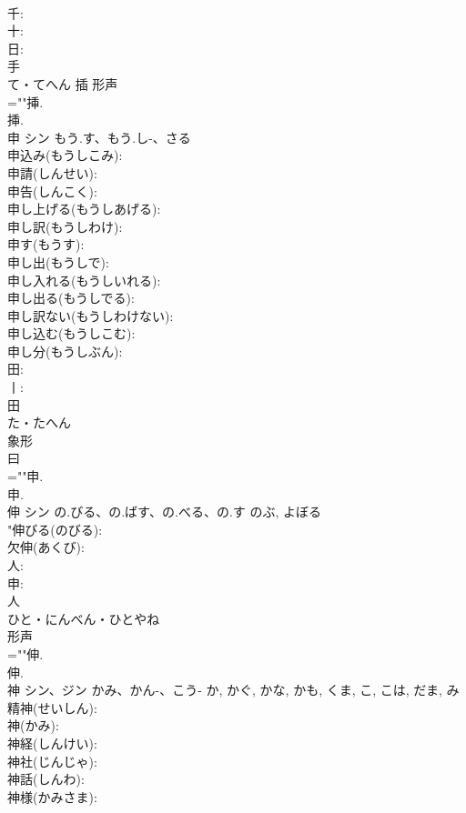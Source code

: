 \documentclass[8pt]{extreport}
\begin{document}
\begin{CJK}{UTF8}{min}
\\	千: 
\\	十: 
\\	日: 
\\	手	
\\	て・てへん	插	形声 
\\	=""挿.
\\	挿.
\\	申	シン	もう.す、もう.し-、さる		
\\	申込み(もうしこみ): 
\\	申請(しんせい): 
\\	申告(しんこく): 
\\	申し上げる(もうしあげる): 
\\	申し訳(もうしわけ): 
\\	申す(もうす): 
\\	申し出(もうしで): 
\\	申し入れる(もうしいれる): 
\\	申し出る(もうしでる): 
\\	申し訳ない(もうしわけない): 
\\	申し込む(もうしこむ): 
\\	申し分(もうしぶん): 
\\	田: 
\\	丨: 
\\	田	
\\	た・たへん	
\\	象形 
\\	曰 
\\	=""申.
\\	申.
\\	伸	シン	の.びる、の.ばす、の.べる、の.す	のぶ, よぼる	
\\	"伸びる(のびる): 
\\	欠伸(あくび): 
\\	人: 
\\	申: 
\\	人	
\\	ひと・にんべん・ひとやね	
\\	形声 
\\	=""伸.
\\	伸.
\\	神	シン、ジン	かみ、かん-、こう-	か, かぐ, かな, かも, くま, こ, こは, だま, み	
\\	精神(せいしん): 
\\	神(かみ): 
\\	神経(しんけい): 
\\	神社(じんじゃ): 
\\	神話(しんわ): 
\\	神様(かみさま): 

\end{CJK}
\end{document}
